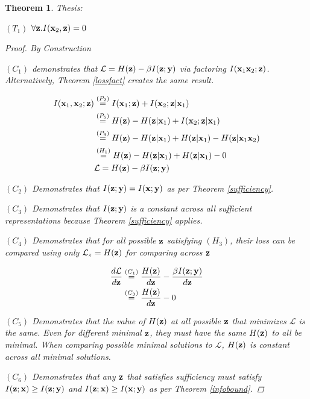 \documentclass{article} %
\theoremstyle{plain}
\newtheorem{theorem}{Theorem}[section]
\theoremstyle{definition}
\theoremstyle{remark}
\begin{document}
\begin{theorem}
Thesis:

$(T_1)$ $\forall {\mathbf{z}}.I({\mathbf{x}}_2,{\mathbf{z}}) = 0$

\begin{proof} By Construction

$(C_1)$ demonstrates that $\mathcal{L}=H({\mathbf{z}}) -\beta I({\mathbf{z}};{\mathbf{y}})$ via factoring $I({\mathbf{x}}_1 {\mathbf{x}}_2;{\mathbf{z}})$. Alternatively, Theorem \ref{lossfact} creates the same result. 

$$
    \begin{aligned}
    I({\mathbf{x}}_1, {\mathbf{x}}_2; {\mathbf{z}}) &\stackrel{\left(P_2\right)}{=} I({\mathbf{x}}_1; {\mathbf{z}}) + I({\mathbf{x}}_2; {\mathbf{z}}| {\mathbf{x}}_1)\\
    &\stackrel{\left(P_5\right)}{=} H({\mathbf{z}}) -  H({\mathbf{z}}| {\mathbf{x}}_1) + I({\mathbf{x}}_2; {\mathbf{z}}| {\mathbf{x}}_1) \\
    &\stackrel{\left(P_9\right)}{=} H({\mathbf{z}}) -  H({\mathbf{z}}| {\mathbf{x}}_1) + H({\mathbf{z}}| {\mathbf{x}}_1) - H({\mathbf{z}}| {\mathbf{x}}_1 {\mathbf{x}}_2) \\
    &\stackrel{\left(H_1\right)}{=}H({\mathbf{z}}) -  H({\mathbf{z}}| {\mathbf{x}}_1) + H({\mathbf{z}}| {\mathbf{x}}_1) - 0 \\
    &\mathcal{L}=H({\mathbf{z}})  -\beta I({\mathbf{z}}; {\mathbf{y}})
    \end{aligned}
$$

$(C_2)$ Demonstrates that $I({\mathbf{z}}; {\mathbf{y}}) = I({\mathbf{x}}; {\mathbf{y}})$ as per Theorem \ref{sufficiency}. 

$(C_3)$ Demonstrates that $I({\mathbf{z}}; {\mathbf{y}})$ is a constant across all sufficient representations because Theorem \ref{sufficiency} applies.

$(C_4)$ Demonstrates that for all possible ${\mathbf{z}}$ satisfying $(H_3)$, their loss can be compared using only $\mathcal{L}_z = H({\mathbf{z}})$ for comparing across ${\mathbf{z}}$

$$
\begin{aligned}
    \frac{d\mathcal{L}}{d{\mathbf{z}}}  &\stackrel{\left(C_1\right)}{=}\frac{H({\mathbf{z}})}{d{\mathbf{z}}} - \frac{\beta I({\mathbf{z}}; {\mathbf{y}})}{d{\mathbf{z}}} \\
&\stackrel{\left(C_3\right)}{=}\frac{H({\mathbf{z}})}{d{\mathbf{z}}} - 0
\end{aligned}
$$

$(C_5)$ Demonstrates that the value of $H({\mathbf{z}})$ at all possible ${\mathbf{z}}$ that minimizes $\mathcal{L}$ is the same. Even for different minimal ${\mathbf{z}}$, they must have the same $H({\mathbf{z}})$ to all be minimal. When comparing possible minimal solutions to $\mathcal{L}$, $H({\mathbf{z}})$ is constant across all minimal solutions. 

$(C_6)$ Demonstrates that any ${\mathbf{z}}$ that satisfies sufficiency must satisfy $I({\mathbf{z}}; {\mathbf{x}}) \geq I({\mathbf{z}}; {\mathbf{y}})$ and $I({\mathbf{z}}; {\mathbf{x}}) \geq I({\mathbf{x}}; {\mathbf{y}})$ as per Theorem \ref{infobound}. 


\end{proof}
\end{theorem}
\end{document}
